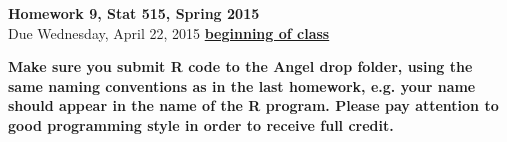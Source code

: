 \documentclass{article}
\begin{document}
\begin{center}
\Large
{\bf Homework 9, Stat 515, Spring 2015}\\
\normalsize
Due Wednesday, April 22, 2015 \underline{{\bf beginning of class}}\\
\end{center}
  {\bf Make sure you submit R code to the Angel drop folder, using
  the same naming conventions as in the last homework, e.g. your name
  should appear in the name of the R program. Please pay attention
to good programming style in order to receive full credit.}
\end{document}
